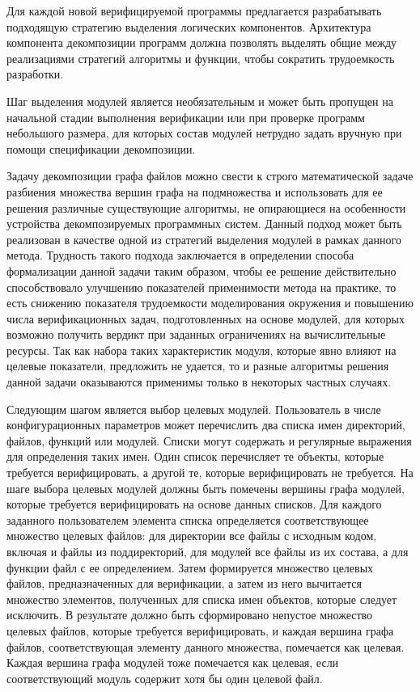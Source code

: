 Для каждой новой верифицируемой программы предлагается разрабатывать подходящую стратегию выделения логических компонентов.
Архитектура компонента декомпозиции программ должна позволять выделять общие между реализациями стратегий алгоритмы и функции, чтобы сократить трудоемкость разработки.

Шаг выделения модулей является необязательным и может быть пропущен на начальной стадии выполнения верификации или при проверке программ небольшого размера, для которых состав модулей нетрудно задать вручную при помощи спецификации декомпозиции.

Задачу декомпозиции графа файлов можно свести к строго математической задаче разбиения множества вершин графа на подмножества и использовать для ее решения различные существующие алгоритмы, не опирающиеся на особенности устройства декомпозируемых программных систем.
Данный подход может быть реализован в качестве одной из стратегий выделения модулей в рамках данного метода.
Трудность такого подхода заключается в определении способа формализации данной задачи таким образом, чтобы ее решение действительно способствовало улучшению показателей применимости метода на практике, то есть снижению показателя трудоемкости моделирования окружения и повышению числа верификационных задач, подготовленных на основе модулей, для которых возможно получить вердикт при заданных ограничениях на вычислительные ресурсы. 
Так как набора таких характеристик модуля, которые явно влияют на целевые показатели, предложить не удается, то и разные алгоритмы решения данной задачи оказываются применимы только в некоторых частных случаях.

Следующим шагом является выбор целевых модулей.
Пользователь в числе конфигурационных параметров может перечислить два списка имен директорий, файлов, функций или модулей.
Списки могут содержать и регулярные выражения для определения таких имен.
Один список перечисляет те объекты, которые требуется верифицировать, а другой те, которые верифицировать не требуется.
На шаге выбора целевых модулей должны быть помечены вершины графа модулей, которые требуется верифицировать на основе данных списков.
Для каждого заданного пользователем элемента списка определяется соответствующее множество целевых файлов: для директории все файлы с исходным кодом, включая и файлы из поддиректорий, для модулей все файлы из их состава, а для функции файл с ее определением.
Затем формируется множество целевых файлов, предназначенных для верификации, а затем из него вычитается множество элементов, полученных для списка имен объектов, которые следует исключить.
В результате должно быть сформировано непустое множество целевых файлов, которые требуется верифицировать, и каждая вершина графа файлов, соответствующая элементу данного множества, помечается как целевая.
Каждая вершина графа модулей тоже помечается как целевая, если соответствующий модуль содержит хотя бы один целевой файл.

